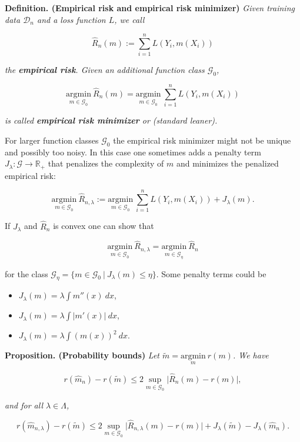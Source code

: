 \documentclass[
]{book}
\providecommand{\tightlist}{%
  \setlength{\itemsep}{0pt}\setlength{\parskip}{0pt}}
\begin{document}
\textbf{Definition. (Empirical risk and empirical risk minimizer)} \emph{Given training data \(\mathcal{D}_n\) and a loss function \(L\), we call}

\[
\hat{R}_n(m):=\sum_{i=1}^nL(Y_i,m(X_i))
\]

\emph{the \textbf{empirical risk}. Given an additional function class \(\mathcal{G}_0\),}

\[
\underset{m\in\mathcal{G}_0}{\text{argmin}}\ \hat{R}_n(m)=\underset{m\in\mathcal{G}_0}{\text{argmin}}\ \sum_{i=1}^nL(Y_i,m(X_i))
\]

\emph{is called \textbf{empirical risk minimizer} or (standard leaner).}

For larger function classes \(\mathcal{G}_0\) the empirical risk minimizer might not be unique and possibly too noisy. In this case one sometimes adds a penalty term \(J_\lambda : \mathcal{G}\to \mathbb{R}_+\) that penalizes the complexity of \(m\) and minimizes the penalized empirical risk:

\[
\underset{m\in\mathcal{G}_0}{\text{argmin}}\ \hat{R}_{n,\lambda}:=\underset{m\in\mathcal{G}_0}{\text{argmin}}\ \sum_{i=1}^nL(Y_i,m(X_i)) + J_\lambda(m).
\]

If \(J_\lambda\) and \(\hat{R}_n\) is convex one can show that

\[
\underset{m\in\mathcal{G}_0}{\text{argmin}}\ \hat{R}_{n,\lambda}=\underset{m\in\mathcal{G}_\eta}{\text{argmin}}\ \hat{R}_{n}
\]

for the class \(\mathcal{G}_\eta=\{m\in \mathcal{G}_0\ \vert\ J_\lambda(m)\le \eta\}\). Some penalty terms could be

\begin{itemize}
\tightlist
\item
  \(J_\lambda(m)=\lambda\int m''(x)\ dx\),
\item
  \(J_\lambda(m)=\lambda \int\vert m'(x)\vert\ dx\),
\item
  \(J_\lambda(m)=\lambda \int(m(x))^2\ dx\).
\end{itemize}

\textbf{Proposition. (Probability bounds)} \emph{Let \(\tilde{m}=\underset{m}{\text{argmin}}\ r(m)\). We have}

\[
r(\hat{m}_n)-r(\tilde{m})\le 2\sup_{m\in\mathcal{G}_0}\Big\vert\hat{R}_n(m) - r(m) \Big\vert,
\]

\emph{and for all \(\lambda \in \Lambda\),}

\[
r(\hat{m}_{n,\lambda})-r(\tilde{m})\le 2\sup_{m\in\mathcal{G}_0}\Big\vert\hat{R}_{n,\lambda}(m) - r(m) \Big\vert + J_\lambda(\tilde{m})-J_\lambda(\hat{m}_n).
\]
\end{document}
